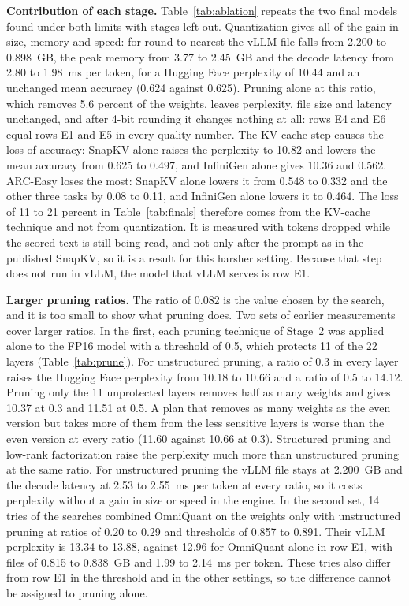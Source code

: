 \documentclass[num-refs]{wiley-article}
\begin{document}
\textbf{Contribution of each stage.} Table~\ref{tab:ablation} repeats the two final models found under both limits with stages left out. Quantization gives all of the gain in size, memory and speed: for round-to-nearest the vLLM file falls from 2.200 to 0.898~GB, the peak memory from 3.77 to 2.45~GB and the decode latency from 2.80 to 1.98~ms per token, for a Hugging Face perplexity of 10.44 and an unchanged mean accuracy (0.624 against 0.625). Pruning alone at this ratio, which removes 5.6 percent of the weights, leaves perplexity, file size and latency unchanged, and after 4-bit rounding it changes nothing at all: rows E4 and E6 equal rows E1 and E5 in every quality number. The KV-cache step causes the loss of accuracy: SnapKV alone raises the perplexity to 10.82 and lowers the mean accuracy from 0.625 to 0.497, and InfiniGen alone gives 10.36 and 0.562. ARC-Easy loses the most: SnapKV alone lowers it from 0.548 to 0.332 and the other three tasks by 0.08 to 0.11, and InfiniGen alone lowers it to 0.464. The loss of 11 to 21 percent in Table~\ref{tab:finals} therefore comes from the KV-cache technique and not from quantization. It is measured with tokens dropped while the scored text is still being read, and not only after the prompt as in the published SnapKV, so it is a result for this harsher setting. Because that step does not run in vLLM, the model that vLLM serves is row E1.

\textbf{Larger pruning ratios.} The ratio of 0.082 is the value chosen by the search, and it is too small to show what pruning does. Two sets of earlier measurements cover larger ratios. In the first, each pruning technique of Stage~2 was applied alone to the FP16 model with a threshold of 0.5, which protects 11 of the 22 layers (Table~\ref{tab:prune}). For unstructured pruning, a ratio of 0.3 in every layer raises the Hugging Face perplexity from 10.18 to 10.66 and a ratio of 0.5 to 14.12. Pruning only the 11 unprotected layers removes half as many weights and gives 10.37 at 0.3 and 11.51 at 0.5. A plan that removes as many weights as the even version but takes more of them from the less sensitive layers is worse than the even version at every ratio (11.60 against 10.66 at 0.3). Structured pruning and low-rank factorization raise the perplexity much more than unstructured pruning at the same ratio. For unstructured pruning the vLLM file stays at 2.200~GB and the decode latency at 2.53 to 2.55~ms per token at every ratio, so it costs perplexity without a gain in size or speed in the engine. In the second set, 14 tries of the searches combined OmniQuant on the weights only with unstructured pruning at ratios of 0.20 to 0.29 and thresholds of 0.857 to 0.891. Their vLLM perplexity is 13.34 to 13.88, against 12.96 for OmniQuant alone in row E1, with files of 0.815 to 0.838~GB and 1.99 to 2.14~ms per token. These tries also differ from row E1 in the threshold and in the other settings, so the difference cannot be assigned to pruning alone.
\end{document}
